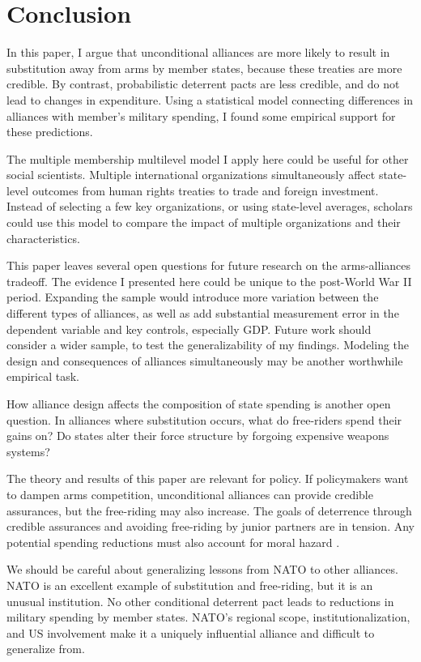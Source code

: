\documentclass[12pt]{article}
\begin{document}
\section*{Conclusion}

In this paper, I argue that unconditional alliances are more likely to result in substitution away from arms by member states, because these treaties are more credible. By contrast, probabilistic deterrent pacts are less credible, and do not lead to changes in expenditure. Using a statistical model connecting differences in alliances with member's military spending, I found some empirical support for these predictions.

The multiple membership multilevel model I apply here could be useful for other social scientists. Multiple international organizations simultaneously affect state-level outcomes from human rights treaties to trade and foreign investment. Instead of selecting a few key organizations, or using state-level averages, scholars could use this model to compare the impact of multiple organizations and their characteristics. 

This paper leaves several open questions for future research on the arms-alliances tradeoff. The evidence I presented here could be unique to the post-World War II period. Expanding the sample would introduce more variation between the different types of alliances, as well as add substantial measurement error in the dependent variable and key controls, especially GDP. Future work should consider a wider sample, to test the generalizability of my findings. Modeling the design and consequences of alliances simultaneously may be another worthwhile empirical task. 

How alliance design affects the composition of state spending is another open question. In alliances where substitution occurs, what do free-riders spend their gains on? Do states alter their force structure by forgoing expensive weapons systems? 

The theory and results of this paper are relevant for policy. If policymakers want to dampen arms competition, unconditional alliances can provide credible assurances, but the free-riding may also increase. The goals of deterrence through credible assurances and avoiding free-riding by junior partners are in tension. Any potential spending reductions must also account for moral hazard \citep{Benson2012}. 

We should be careful about generalizing lessons from NATO to other alliances. NATO is an excellent example of substitution and free-riding, but it is an unusual institution. No other conditional deterrent pact leads to reductions in military spending by member states. NATO's regional scope, institutionalization, and US involvement make it a uniquely influential alliance and difficult to generalize from. 
\end{document}
